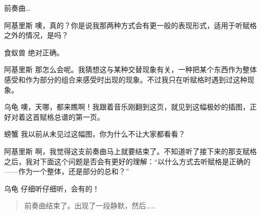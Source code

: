 \begin{dialog}{前奏曲…}
\begin{dialogue}
\item[阿基里斯]噢，真的？你是说我那两种方式会有更一般的表现形式，适用于听赋格之外的情况，是吗？

\item[食蚁兽]绝对正确。

\item[阿基里斯]那怎么会呢。我猜想这与某种交替现象有关，一种把某个东西作为整体感受和作为部分的组合来感受时出现的现象。不过我只在听赋格时遇到过这种现象。

\item[乌龟]噢，天哪，都来瞧啊！我跟着音乐刚翻到这页，就见到这幅极妙的插图，正好对着这首赋格总谱的第一页。

\item[螃蟹]我以前从未见过这幅图，你为什么不让大家都看看？


\item[阿基里斯]啊，我觉得这支前奏曲马上就要结束了。不知道听了接下来的那支赋格之后，我对下面这个问题是否会有更好的理解：“以什么方式去听赋格是正确的——作为一个整体，还是部分的总和？”

\item[乌龟]仔细听仔细听，会有的！

\end{dialogue}

\begin{quote}
前奏曲结束了。出现了一段静默，然后……
\end{quote}

\begin{flushright}
\lnote{[紧接下段]}
\end{flushright}

\end{dialog}
